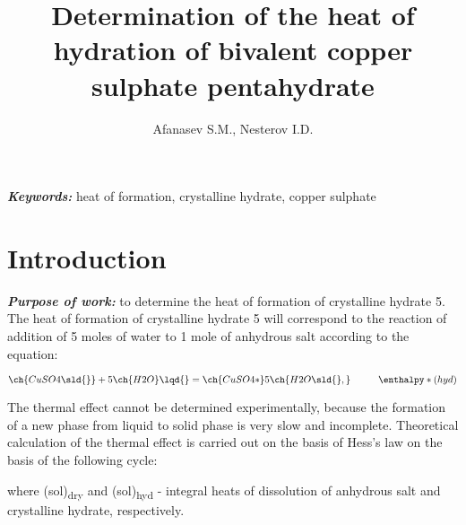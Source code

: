 \documentclass[12pt, letterpaper]{article}
\title{Determination of the heat of hydration of bivalent copper sulphate pentahydrate}
\author{Afanasev S.M., Nesterov I.D.}
\date{}
\providecommand{\keywords} {
    \small	
    \textbf{\textit{Keywords:}}
}
\begin{document}
    \maketitle
    \keywords{
        heat of formation,
        crystalline hydrate,
        copper sulphate}
    \tableofcontents
    \newpage

    \section*{Introduction}
        \textbf{\textit{Purpose of work:}} to determine the heat of formation of crystalline hydrate 5. \\ 
        
        The heat of formation of crystalline hydrate 5 will correspond to
        the reaction of addition of 5 moles of water to 1 mole of anhydrous salt according to the equation:

        \begin{equation}
            \ch{CuSO4\sld{}} + 5 {\ch{H2O}\lqd{}} = \ch{CuSO4*}5\ch{H2O\sld{},} \hspace{10 mm} \enthalpy*(hyd){}
        \end{equation}

        The thermal effect cannot be determined experimentally,
        because the formation of a new phase from liquid to solid phase is very slow and incomplete.
        Theoretical calculation of the thermal effect is carried out on the basis of Hess's law
        on the basis of the following cycle: 
        \begin{center}
        \end{center}
        
        where \enthalpy*(sol){}\textsubscript{dry} and \enthalpy*(sol){}\textsubscript{hyd} - integral heats of dissolution
        of anhydrous salt and crystalline hydrate, respectively. \\
\end{document}
